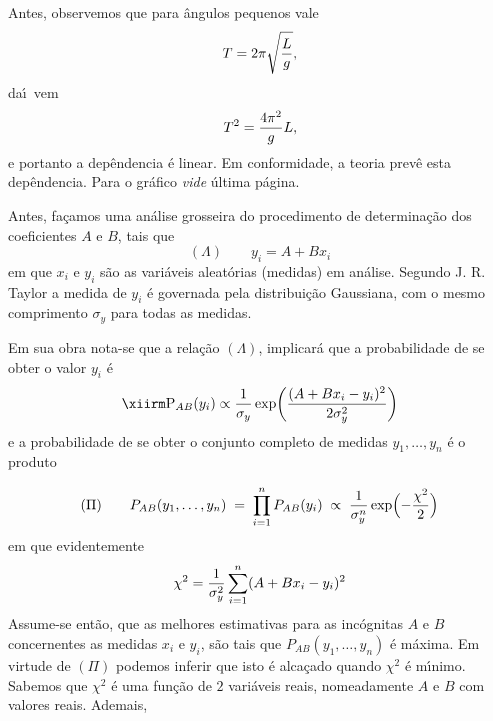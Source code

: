 Antes, observemos que para \^angulos pequenos vale 
$$
  T=2\pi\sqrt{L\over g},
$$
da\'\i\ vem
$$
  T^2={4\pi^2\over g}L,
$$
e portanto a dep\^endencia \'e linear. Em conformidade, a teoria prev\^e esta dep\^endencia. Para o gr\'afico {\it vide} \'ultima p\'agina.


 Antes, fa\c camos uma an\'alise grosseira do procedimento de determina\c c\~ao dos coeficientes $A$ e $B$, tais que
$$
  (\Lambda)\qquad y_i=A+Bx_i
$$
em que $x_i$ e $y_i$ s\~ao as vari\'aveis aleat\'orias (medidas) em an\'alise. Segundo J. R. Taylor a medida de $y_i$ \'e governada pela distribui\c c\~ao Gaussiana, com o mesmo comprimento $\sigma_y$ para todas as medidas.

Em sua obra nota-se que a rela\c c\~ao $(\Lambda)$, implicar\'a que a probabilidade de se obter o valor $y_i$ \'e
$$
  {\rm P}_{AB}(y_i)\propto{1\over\sigma_y}\exp\biggl({(A+Bx_i-y_i)^2\over2\sigma_y^2}\biggr)
$$
e a probabilidade de se obter o conjunto completo de medidas $y_1,\ldots,y_n$ \'e o produto

$$
  (\Pi)\qquad P_{AB}(y_1,\ldots,y_n)\;=\;\prod_{i=1}^nP_{AB}(y_i)\;\propto\;{1\over\sigma_y^n}\exp\Bigl(-{\chi^2\over2}\Bigr)
$$
em que evidentemente
$$
  \chi^2={1\over\sigma_y^2}\sum_{i=1}^n(A+Bx_i-y_i)^2
$$
Assume-se ent\~ao, que as melhores estimativas para as inc\'ognitas $A$ e $B$ concernentes as medidas $x_i$ e $y_i$, s\~ao tais que $P_{AB}(y_1,\ldots,y_n)$ \'e m\'axima. Em virtude de $(\Pi)$ podemos inferir que isto \'e alca\c cado quando $\chi^2$ \'e m\'\i nimo. Sabemos que $\chi^2$ \'e uma fun\c c\~ao de $2$ vari\'aveis reais, nomeadamente $A$ e $B$ com valores reais. Ademais,

